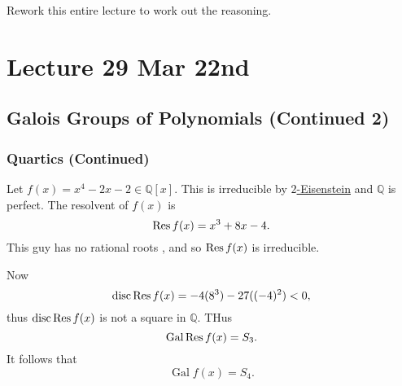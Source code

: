 \documentclass[notoc,notitlepage,nobib]{tufte-book}
\DeclareMathOperator{\disc}{disc}
\DeclareMathOperator{\Gal}{Gal}
\begin{document}
\begin{note}
  Rework this entire lecture to work out the reasoning.
\end{note}





\chapter{Lecture 29 Mar 22nd}%
\label{chp:lecture_29_mar_22nd}

\section{Galois Groups of Polynomials (Continued 2)}%
\label{sec:galois_groups_of_polynomials_continued_2}

\subsection{Quartics (Continued)}%
\label{sub:quartics_continued}

\begin{eg}
  Let $f(x) = x^4 - 2x - 2 \in \mathbb{Q}[x]$. This is irreducible by
  \hyperref[propo:eisenstein_s_criterion]{$2$-Eisenstein} and $\mathbb{Q}$ is
  perfect. The resolvent of $f(x)$ is
  \begin{equation*}
    \operatorname{Res} f(x) = x^3 + 8x - 4.
  \end{equation*}
  This guy has no rational roots , and so $\operatorname{Res} f(x)$ is
  irreducible.

  Now
  \begin{equation*}
    \disc \Res f(x) = -4(8^3) - 27((-4)^2) < 0,
  \end{equation*}
  thus $\disc \Res f(x)$ is not a square in $\mathbb{Q}$. THus
  \begin{equation*}
    \Gal \Res f(x) = S_3.
  \end{equation*}
  It follows that
  \begin{equation*}
    \Gal f(x) = S_4.
  \end{equation*}
\end{eg}
\end{document}
